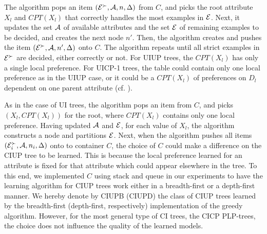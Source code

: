 \smallskip \noindent {}
The algorithm pops an item $(\mathcal{E}^\succ,\mathcal{A},n,\Delta)$ from $C$, and
picks the root attribute $X_l$ and
$CPT(X_l)$ that correctly handles the most examples in $\mathcal{E}$.
Next, it updates the set $\mathcal{A}$ of available attributes and the
set $\mathcal{E}$ of remaining examples to be decided, and creates 
the next node $n'$.  Then, the algorithm creates and pushes the item
$(\mathcal{E}^\succ,\mathcal{A},n',\Delta)$ onto $C$.
The algorithm repeats until all strict
examples in $\mathcal{E}^\succ$ are decided, either correctly or not.
For UIUP trees, the $CPT(X_l)$ has only a single local preference.
For UICP-1 trees, the table could contain only one local preference
as in the UIUP case, or it could be a $CPT(X_l)$ of preferences on
$D_l$ dependent on one parent attribute (cf. ).

\smallskip \noindent {}
As in the case of UI trees, the algorithm pops an item from $C$,
and picks $(X_l,CPT(X_l))$
for the root, where $CPT(X_l)$ contains only one local preference.
Having updated $\mathcal{A}$ and $\mathcal{E}$, for each value of $X_l$,
the algorithm constructs a node and partitions $\mathcal{E}$.
Next, when the algorithm pushes all items $(\mathcal{E}^\succ_i,\mathcal{A},n_i,\Delta)$
onto to container $C$, the choice of $C$ could make a difference on
the CIUP tree to be learned.
This is because the local preference learned for an attribute is fixed
for that attribute which could appear elsewhere in the tree.
To this end, we implemented $C$ using stack and queue in our
experiments to have the learning algorithm for CIUP trees work either
in a breadth-first or a depth-first manner.
We hereby denote by CIUPB (CIUPD) the class of CIUP trees
learned by the breadth-first (depth-first, respectively) implementation
of the greedy algorithm.
However, for the most general type of CI trees, the CICP PLP-trees, 
the choice does not influence the quality of the learned models.

